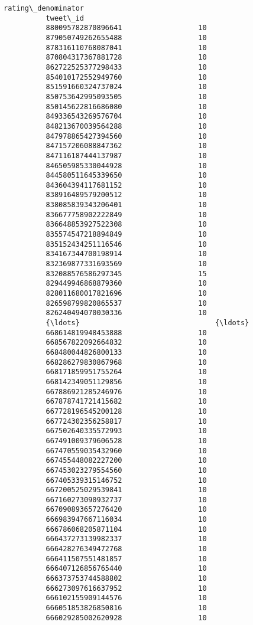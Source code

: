 \documentclass[11pt]{article}
\begin{document}
\begin{Verbatim}[commandchars=\\\{\}]
                              rating\_denominator  
          tweet\_id                                
          880095782870896641                  10  
          879050749262655488                  10  
          878316110768087041                  10  
          870804317367881728                  10  
          862722525377298433                  10  
          854010172552949760                  10  
          851591660324737024                  10  
          850753642995093505                  10  
          850145622816686080                  10  
          849336543269576704                  10  
          848213670039564288                  10  
          847978865427394560                  10  
          847157206088847362                  10  
          847116187444137987                  10  
          846505985330044928                  10  
          844580511645339650                  10  
          843604394117681152                  10  
          838916489579200512                  10  
          838085839343206401                  10  
          836677758902222849                  10  
          836648853927522308                  10  
          835574547218894849                  10  
          835152434251116546                  10  
          834167344700198914                  10  
          832369877331693569                  10  
          832088576586297345                  15  
          829449946868879360                  10  
          828011680017821696                  10  
          826598799820865537                  10  
          826240494070030336                  10  
          {\ldots}                                {\ldots}  
          668614819948453888                  10  
          668567822092664832                  10  
          668480044826800133                  10  
          668286279830867968                  10  
          668171859951755264                  10  
          668142349051129856                  10  
          667886921285246976                  10  
          667878741721415682                  10  
          667728196545200128                  10  
          667724302356258817                  10  
          667502640335572993                  10  
          667491009379606528                  10  
          667470559035432960                  10  
          667455448082227200                  10  
          667453023279554560                  10  
          667405339315146752                  10  
          667200525029539841                  10  
          667160273090932737                  10  
          667090893657276420                  10  
          666983947667116034                  10  
          666786068205871104                  10  
          666437273139982337                  10  
          666428276349472768                  10  
          666411507551481857                  10  
          666407126856765440                  10  
          666373753744588802                  10  
          666273097616637952                  10  
          666102155909144576                  10  
          666051853826850816                  10  
          666029285002620928                  10  
          

\end{Verbatim}
\end{document}
